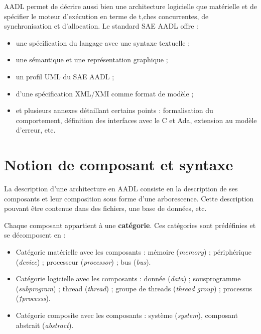 \documentclass[11pt,a4paper]{paper}
\begin{document}
\begin{appendices}
AADL permet de décrire aussi bien une architecture logicielle que matérielle et de spécifier le moteur d'exécution en terme de t‚ches concurrentes, de synchronisation et d'allocation. Le standard SAE AADL offre : 
\begin{itemize}
	\item une spécification du langage avec une syntaxe textuelle ;
	\item une sémantique et une représentation graphique ;
	\item un profil UML du SAE AADL ;
	\item d'une spécification XML/XMI comme format de modèle ;
	\item et plusieurs annexes détaillant certains points : formalisation du comportement, définition des interfaces avec le C et Ada, extension au modèle d'erreur, etc.\\
\end{itemize}


\section{Notion de composant et syntaxe}


La description d'une architecture en AADL consiste en la description de ses composants et leur composition sous forme d'une arborescence. Cette description pouvant être contenue dans des fichiers, une base de données, etc.


Chaque composant appartient à une {\bf catégorie}. Ces catégories sont prédéfinies et se décomposent en :
\begin{itemize}
	\item Catégorie matérielle avec les composants : mémoire ({\em memory}) ; périphérique ({\em device}) ; processeur ({\em processor}) ; bus ({\em bus}).
	\item Catégorie logicielle avec les composants :  donnée ({\em data}) ; sousprogramme ({\em subprogram}) ; thread ({\em thread}) ; groupe de threads ({\em thread group}) ; processus ({\em†processs}).
	\item Catégorie composite avec les composants : système ({\em system}), composant abstrait ({\em  abstract}).\\
\end{itemize}



\end{appendices}
\end{document}
